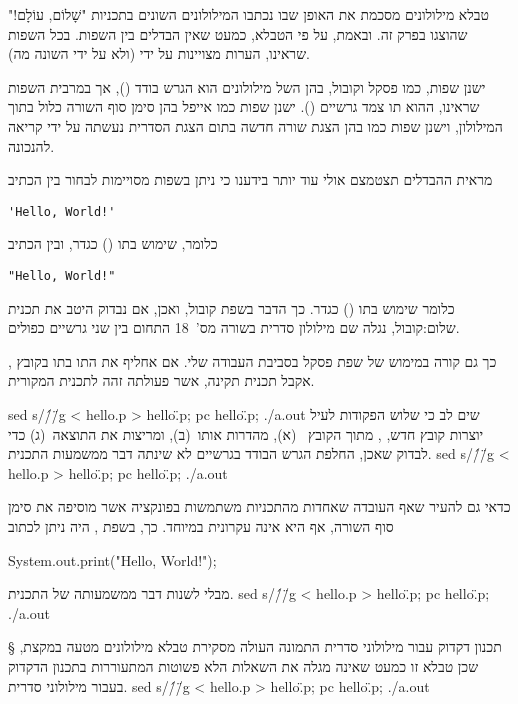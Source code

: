  טבלא מילולונים מסכמת את האופן שבו נכתבו המילולונים השונים בתכניות "שָׁלוֹם,
עוֹלָם!" שהוצגו בפרק זה. ובאמת, על פי הטבלא, כמעט שאין הבדלים בין השפות. בכל
השפות שראינו, הערות מצויינות על ידי  (ולא על ידי  השונה מה).

ישנן שפות, כמו פסקל וקובול, בהן ה של מילולונים הוא הגרש בודד (), אך
במרבית השפות שראינו, ה הוא תו צמד גרשיים (). ישנן שפות כמו אייפל בהן
סימן סוף השורה כלול בתוך המילולון, וישנן שפות כמו  בהן הצגת שורה חדשה
בתום הצגת הסדרית נעשתה על ידי קריאה ל הנכונה.

מראית ההבדלים תצטמצם אולי עוד יותר בידענו כי ניתן בשפות מסויימות
לבחור בין הכתיב
\begin{קוד}
\let\ttfamily=\listingsfont
\verb+'Hello, World!'+
\end{קוד}
כלומר, שימוש בתו () כגדר, ובין הכתיב
\begin{קוד}
\let\ttfamily=\listingsfont
\verb+"Hello, World!"+
\end{קוד}
כלומר שימוש בתו () כגדר.
כך הדבר בשפת קובול, ואכן, אם נבדוק היטב את  תכנית שלום:קובול,
נגלה שם מילולון סדרית בשורה מס'~18 התחום בין שני גרשיים כפולים.
\begin{קוד}
\end{קוד}
כך גם קורה במימוש של שפת פסקל בסביבת העבודה שלי.
אם אחליף את התו  בתו  בקובץ ,
אקבל תכנית תקינה, אשר פעולתה זהה לתכנית המקורית.

sed s/\'/\"/g < hello.p > hello\".p; pc hello\".p; ./a.out
\END
שים לב כי שלוש הפקודות לעיל יוצרות קובץ חדש,
{\let\ttfamily=\listingsfont{}},
מתוך הקובץ
{\let\ttfamily=\listingsfont{}}%
~(א),
מהדרות אותו~(ב), ומריצות את התוצאה~(ג) כדי לבדוק שאכן, החלפת הגרש הבודד בגרשיים
לא שינתה דבר ממשמעות התכנית.
sed s/\'/\"/g < hello.p > hello\".p; pc hello\".p; ./a.out
\END

כדאי גם להעיר שאף העובדה שאחדות מהתכניות משתמשות בפונקציה אשר מוסיפה
את סימן סוף השורה, אף היא אינה עקרונית במיוחד. כך, בשפת ,
היה ניתן לכתוב
\begin{קוד}
  \begin{JAVA}
System.out.print("Hello, World!\n");
  \end{JAVA}
\end{קוד}
מבלי לשנות דבר ממשמעותה של התכנית.
sed s/\'/\"/g < hello.p > hello\".p; pc hello\".p; ./a.out
\END

§ תכנון דקדוק עבור מילולוני סדרית
התמונה העולה מסקירת  טבלא מילולונים מטעה במקצת, שכן טבלא זו כמעט שאינה מגלה
את השאלות הלא פשוטות המתעוררות בתכנון הדקדוק בעבור מילולוני סדרית.
sed s/\'/\"/g < hello.p > hello\".p; pc hello\".p; ./a.out
\END

